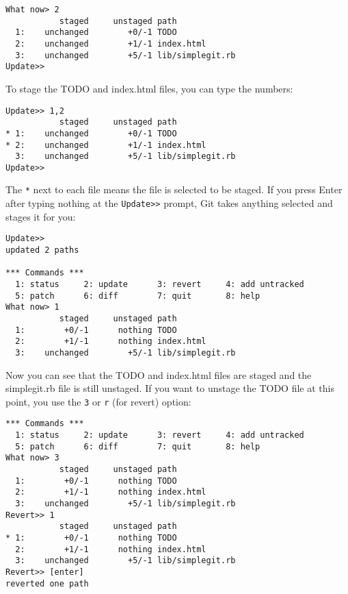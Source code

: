 \documentclass[a4paper]{book}
\begin{document}
\begin{shaded}\begin{verbatim}
What now> 2
           staged     unstaged path
  1:    unchanged        +0/-1 TODO
  2:    unchanged        +1/-1 index.html
  3:    unchanged        +5/-1 lib/simplegit.rb
Update>>
\end{verbatim}\end{shaded}

To stage the TODO and index.html files, you can type the numbers:

\begin{shaded}\begin{verbatim}
Update>> 1,2
           staged     unstaged path
* 1:    unchanged        +0/-1 TODO
* 2:    unchanged        +1/-1 index.html
  3:    unchanged        +5/-1 lib/simplegit.rb
Update>>
\end{verbatim}\end{shaded}

The \texttt{*} next to each file means the file is selected to be staged. If you press Enter after typing nothing at the \texttt{Update\textgreater{}\textgreater{}} prompt, Git takes anything selected and stages it for you:

\begin{shaded}\begin{verbatim}
Update>>
updated 2 paths

*** Commands ***
  1: status     2: update      3: revert     4: add untracked
  5: patch      6: diff        7: quit       8: help
What now> 1
           staged     unstaged path
  1:        +0/-1      nothing TODO
  2:        +1/-1      nothing index.html
  3:    unchanged        +5/-1 lib/simplegit.rb
\end{verbatim}\end{shaded}

Now you can see that the TODO and index.html files are staged and the simplegit.rb file is still unstaged. If you want to unstage the TODO file at this point, you use the \texttt{3} or \texttt{r} (for revert) option:

\begin{shaded}\begin{verbatim}
*** Commands ***
  1: status     2: update      3: revert     4: add untracked
  5: patch      6: diff        7: quit       8: help
What now> 3
           staged     unstaged path
  1:        +0/-1      nothing TODO
  2:        +1/-1      nothing index.html
  3:    unchanged        +5/-1 lib/simplegit.rb
Revert>> 1
           staged     unstaged path
* 1:        +0/-1      nothing TODO
  2:        +1/-1      nothing index.html
  3:    unchanged        +5/-1 lib/simplegit.rb
Revert>> [enter]
reverted one path
\end{verbatim}\end{shaded}
\end{document}

